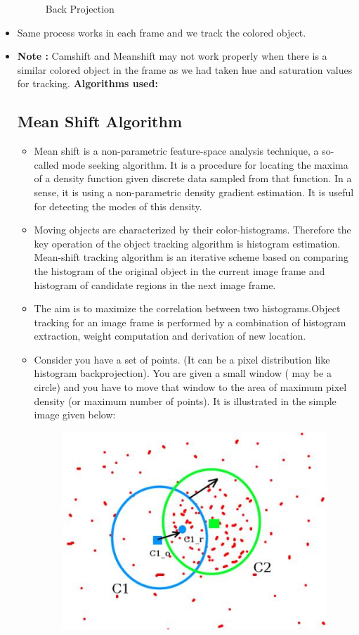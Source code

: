 \documentclass[11pt,a4paper]{article}
\begin{document}
\begin{itemize}
\begin{figure}[h!]
			\centering
			\caption{Back Projection}
		\end{figure}
		\item Same process works in each frame and we track the colored object.
		\item \textbf{Note :} Camshift and Meanshift may not work properly when there is a similar colored object in the frame as we had taken hue and saturation values for tracking.
		\newpage
		\textbf{Algorithms used:}
	\vspace{0.2cm}
	\subsection{Mean Shift Algorithm}
	\begin{itemize}
	 \item Mean shift is a non-parametric feature-space analysis technique, a so-called mode seeking algorithm. It is a procedure for locating the maxima of a density function given discrete data sampled from that function. In a sense, it is using a non-parametric density gradient estimation. It is useful for detecting the modes of this density.
	 \item Moving objects are characterized by their color-histograms. Therefore the key operation of the object tracking algorithm is histogram estimation. Mean-shift tracking algorithm is an iterative scheme based on comparing the histogram of the original object in the current image frame and histogram of candidate regions in the next image frame. 
	  \item The aim is to maximize the correlation between two histograms.Object tracking for an image frame is performed by a combination of histogram extraction, weight computation and derivation of new location. 
	    \item Consider you have a set of points. (It can be a pixel distribution like histogram backprojection). You are given a small window ( may be a circle) and you have to move that window to the area of maximum pixel density (or maximum number of points). It is illustrated in the simple image given below:
	    \begin{figure}[h!]
			\includegraphics[scale=0.5 ]{meanshift.jpg}
			\centering
			\caption{  }
		\end{figure}
	 

\end{itemize}
\end{itemize}
\end{document}
